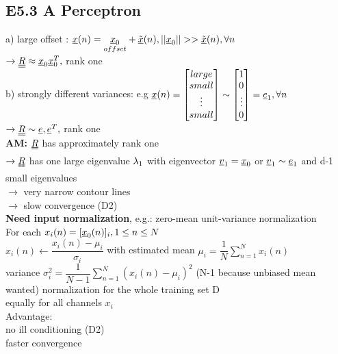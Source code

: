 \subsection{E5.3 A Perceptron}
a) large offset : $  {\underline x} (n) = \underset{offset}{{\underline x}_0} + \tilde{{\underline x}} (n) , || {\underline x} _ 0 || >> \tilde{{\underline x}} (n) , \forall n  $\\
$\rightarrow \underline{\underline{R}} \approx {\underline x}_0 {\underline x}_0^T ,$ rank one \\
b) strongly different variances: e.g $  {\underline x}(n) = \left[ \begin{matrix}
large \\
small \\
\vdots \\
small
\end{matrix} \right]  \sim \left[ \begin{matrix}
1 \\
0 \\
\vdots \\
0 
\end{matrix} \right] = {\underline e}_1 , \forall n$ \\
$\rightarrow \underline{\underline{R}} \sim {\underline e}, {\underline e}^T , $ rank one \\
\textbf{AM:} $ \RR  $ has approximately rank one \\
$\rightarrow  \RR $ has one large eigenvalue $  \lambda_1 $ with eigenvector $  {\underline v}_1 = {\underline x}_0 $ or $ {\underline v}_1 \sim {\underline e}_1 $ and d-1 small eigenvalues\\
$\rightarrow $ very narrow contour lines \\
$ \rightarrow $ slow convergence (D2)\\
\textbf{Need input normalization}, e.g.: zero-mean unit-variance normalization \\
For each $  x_i(n)  = [ {\underline x}_0 (n)] _i, 1 \leq n \leq N$\\
$  x_i(n) \leftarrow \dfrac{x_i (n)- \mu_i}{\sigma_i} $ with estimated mean $  \mu_i = \dfrac{1}{N} \sum_{n=1}^{N} x_i (n) $ \\
variance $  \sigma_i^2 = \dfrac{1}{N-1} \sum_{n=1}^{N} (x_i (n) - \mu_i )^2 $ (N-1 because unbiased mean wanted)
\textbullet normalization for the whole training set D \\
\textbullet equally for all channels $ x_i $\\
Advantage: \\
\textbullet no ill conditioning (D2) \\
\textbullet faster convergence 
